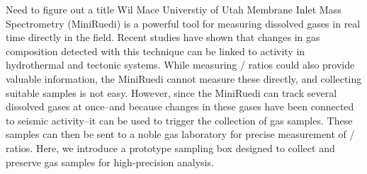 \begin{conf-abstract}
{Need to figure out a title}
{Wil Mace}
{Universtiy of Utah}
{Membrane Inlet Mass Spectrometry (MiniRuedi) is a powerful tool for measuring dissolved gases in real time directly in the field. Recent studies have shown that changes in gas composition detected with this technique can be linked to activity in hydrothermal and tectonic systems.  While measuring / ratios could also provide valuable information, the MiniRuedi cannot measure these directly, and collecting suitable samples is not easy. However, since the MiniRuedi can track several dissolved gases at once--and because changes in these gases have been connected to seismic activity--it can be used to trigger the collection of gas samples. These samples can then be sent to a noble gas laboratory for precise measurement of / ratios.  Here, we introduce a prototype sampling box designed to collect and preserve gas samples for high-precision analysis.}
\end{conf-abstract}




